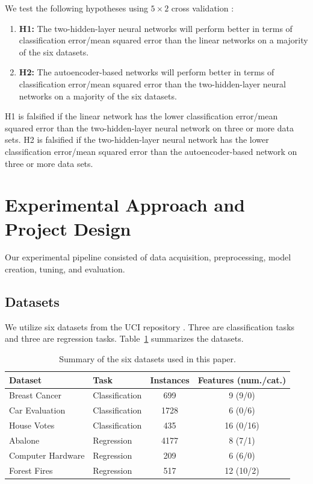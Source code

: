 \documentclass[twoside,11pt]{article}
\begin{document}
We test the following hypotheses using $5 \times 2$ cross validation \citep{alpaydin2020}:
\begin{enumerate}
    \item \textbf{H1:} The two-hidden-layer neural networks will perform better in terms of classification error/mean squared error than the linear networks on a majority of the six datasets.
    \item \textbf{H2:} The autoencoder-based networks will perform better in terms of classification error/mean squared error than the two-hidden-layer neural networks on a majority of the six datasets.
\end{enumerate}
H1 is falsified if the linear network has the lower classification error/mean squared error than the two-hidden-layer neural network on three or more data sets. H2 is falsified if the two-hidden-layer neural network has the lower classification error/mean squared error than the autoencoder-based network on three or more data sets.


\section{Experimental Approach and Project Design}
Our experimental pipeline consisted of data acquisition, preprocessing, model creation, tuning, and evaluation.

\subsection{Datasets}
We utilize six datasets from the UCI repository \citep{uci_repository}. Three are classification tasks and three are regression tasks. Table~\ref{tab:datasets} summarizes the datasets.

\begin{table}[h]
    \centering
    \begin{tabular}{llcc}
    \hline
    Dataset & Task & Instances & Features (num./cat.) \\
    \hline
    Breast Cancer     & Classification & 699  & 9 (9/0) \\
    Car Evaluation    & Classification & 1728 & 6 (0/6) \\
    House Votes       & Classification & 435  & 16 (0/16) \\
    Abalone           & Regression     & 4177 & 8 (7/1) \\
    Computer Hardware & Regression     & 209  & 6 (6/0) \\
    Forest Fires      & Regression     & 517  & 12 (10/2) \\
    \hline
    \end{tabular}
    \caption{Summary of the six datasets used in this paper.}
    \label{tab:datasets}
\end{table}
\end{document}
